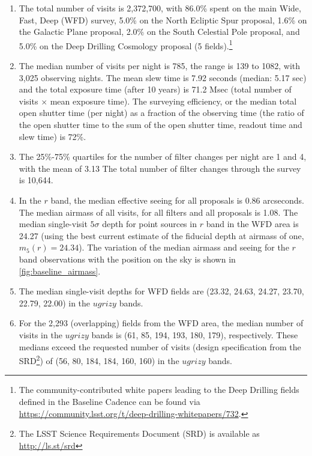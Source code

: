 \documentclass[DM,authoryear,toc]{lsstdoc}
\begin{document}
\begin{enumerate}
\item The total number of visits is 2,372,700, with 86.0\% spent on
the main Wide, Fast, Deep (WFD) survey, 5.0\% on the
North Ecliptic Spur proposal, 1.6\% on the Galactic Plane proposal, 2.0\%
on the South Celestial Pole proposal, and 5.0\% on the Deep Drilling
Cosmology proposal (5 fields).\footnote{The community-contributed white papers leading to the
Deep Drilling fields defined in the Baseline Cadence can be found via
\url{https://community.lsst.org/t/deep-drilling-whitepapers/732}.}

\item The median number of visits per night is 785, the range is
139 to 1082, with 3,025 observing nights. The mean slew time is 7.92
seconds (median: 5.17 sec) and the total exposure time (after 10 years) is 71.2 Msec (total number of visits $\times$ mean exposure time).
The surveying efficiency, or the median total open shutter time (per night)
as a fraction of the observing time (the ratio of the open shutter time to
the sum of the open shutter time, readout time and slew time) is 72\%.

\item The 25\%-75\% quartiles for the number of filter changes per night are 1
and 4, with the mean of 3.13 The total number of filter changes through the survey is 10,644.

\item In the $r$ band, the median effective seeing for all proposals is 0.86 arcseconds.
The median airmass of all visits, for all filters and all proposals is 1.08.
The median single-visit $5\sigma$ depth for point sources in $r$ band in the WFD area is 24.27 (using the best
current estimate of the fiducial depth at airmass of one, $m_5(r)=24.34$).
The variation of the median airmass and seeing for the $r$
band observations with the position on the sky is shown in
\autoref{fig:baseline_airmass}.

\item The median single-visit depths for WFD fields are (23.32, 24.63, 24.27,
23.70, 22.79, 22.00) in the $ugrizy$ bands.

\item For the 2,293 (overlapping) fields from the WFD area,
the median number of visits in the $ugrizy$ bands is (61, 85, 194, 193, 180,
179), respectively. These medians exceed the requested
number of visits (design specification from the SRD\footnote{The LSST
Science Requirements Document (SRD) is available as
\url{http://ls.st/srd}}) of (56, 80, 184, 184, 160, 160) in the $ugrizy$
bands.


\end{enumerate}
\end{document}
